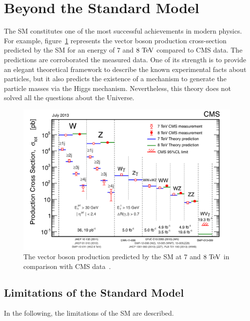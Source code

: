 
  \section{Beyond the Standard Model}

  The \gls{SM} constitutes one of the most successful achievements in modern physics.
  For example, figure~\ref{fig:SMvalidation} represents the vector boson production cross-section predicted by the \gls{SM} for an energy of $7$ and $8~\rm{TeV}$ compared to CMS data.
  The predictions are corroborated the measured data.
  One of its strength is to provide an elegant theoretical framework to describe the known experimental facts about particles, but it also predicts the existence of a mechanism to generate the particle masses via the Higgs mechanism.
  Nevertheless, this theory does not solved all the questions about the Universe.

  \begin{figure}[!h]
    \centering
    \includegraphics[width = \textwidth]{Pictures/SM/productionXsectionSMvsCMS.png}
    \caption{The vector boson production predicted by the SM at $7$ and $8~\rm{TeV}$ in comparison with CMS data~\cite{deBoer:2013pud}.}
    \label{fig:SMvalidation}
  \end{figure}
  
    \subsection{Limitations of the Standard Model}

    In the following, the limitations of the \gls{SM} are described.

